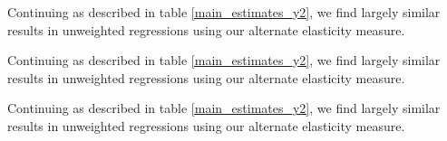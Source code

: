 \begin{table}[H]
	\begin{center}
		
		\label{transportation_estimates_y2}
		\caption[Alternate Transportation Infrastructure Predictor Estimates, Unweighted]{Continuing as described in table \ref{main_estimates_y2}, we find largely similar results in unweighted regressions using our alternate elasticity measure.}
	\end{center}
\end{table}

\begin{table}[H]
	\begin{center}
		
		\label{demographic_estimates_y2}
		\caption[Alternate Demographic Predictor Estimates, Unweighted]{Continuing as described in table \ref{main_estimates_y2}, we find largely similar results in unweighted regressions using our alternate elasticity measure.}
	\end{center}
\end{table}

\begin{table}[H]
	\begin{center}
		
		\label{pop_share_estimates_y2}
		\caption[Alternate Cheaper Gas Border Predictor Estimates, Unweighted]{Continuing as described in table \ref{main_estimates_y2}, we find largely similar results in unweighted regressions using our alternate elasticity measure.}
	\end{center}
\end{table}
